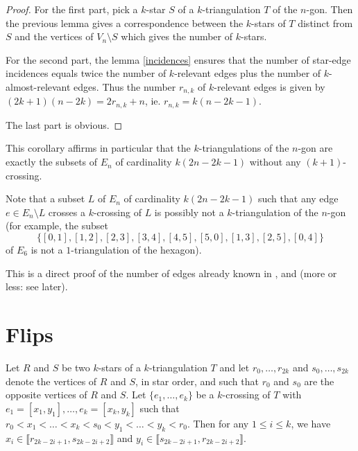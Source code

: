 \documentclass[12pt]{amsart}
\begin{document}
\begin{proof}
For the first part, pick a $k$-star $S$ of a $k$-triangulation $T$ of the $n$-gon. Then the previous lemma gives a correspondence between the $k$-stars of $T$ distinct from $S$ and the vertices of $V_n\setminus S$ which gives the number of $k$-stars.

For the second part, the lemma \ref{incidences} ensures that the number of star-edge incidences equals twice the number of $k$-relevant edges plus the number of $k$-almost-relevant edges. Thus the number $r_{n,k}$ of $k$-relevant edges is given by $(2k+1)(n-2k)=2r_{n,k}+n$, ie. $r_{n,k}=k(n-2k-1)$.

The last part is obvious.
\end{proof}

\begin{remark}
This corollary affirms in particular that the $k$-triangulations of the $n$-gon are exactly the subsets of $E_n$ of cardinality $k(2n-2k-1)$ without any $(k+1)$-crossing.

Note that a subset $L$ of $E_n$ of cardinality $k(2n-2k-1)$ such that any edge $e\in E_n\setminus L$ crosses a $k$-crossing of $L$ is possibly not a $k$-triangulation of the $n$-gon (for example, the subset $$\{[0,1],[1,2],[2,3],[3,4],[4,5],[5,0],[1,3],[2,5],[0,4]\}$$ of $E_6$ is not a $1$-triangulation of the hexagon).
\end{remark}

\begin{bibremark}
This is a direct proof of the number of edges already known in \cite{n-gdfcp-00}, \cite{j-gt} and \cite{dkm-lahp-02} (more or less: see later).

\end{bibremark}


\section{Flips}

\begin{lemma}
Let $R$ and $S$ be two $k$-stars of a $k$-triangulation $T$ and let $r_0,\ldots,r_{2k}$ and $s_0,\ldots,s_{2k}$ denote the vertices of $R$ and $S$, in star order, and such that $r_0$ and $s_0$ are the opposite vertices of $R$ and $S$. Let $\{e_1,\ldots,e_k\}$ be a $k$-crossing of $T$ with $e_1=[x_1,y_1],\ldots,e_k=[x_k,y_k]$ such that $r_0<x_1<\ldots<x_k<s_0<y_1<\ldots<y_k<r_0$. Then for any $1\le i\le k$, we have $x_i\in\llbracket r_{2k-2i+1},s_{2k-2i+2}\rrbracket$ and $y_i\in\llbracket s_{2k-2i+1},r_{2k-2i+2}\rrbracket$.
\end{lemma}
\end{document}
